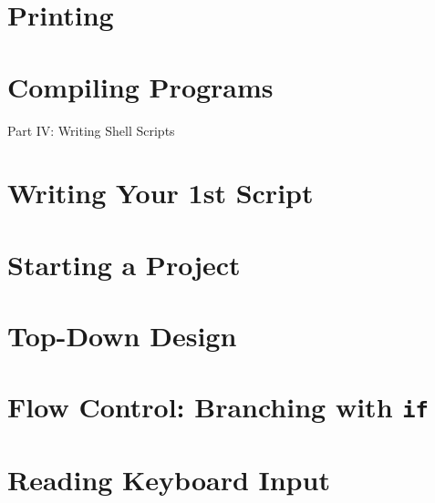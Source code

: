 \documentclass[oneside]{book}
\numberwithin{equation}{section}
\begin{document}

\section{Printing}


\section{Compiling Programs}


\begin{center}
	\huge Part IV: Writing Shell Scripts
\end{center}


\section{Writing Your 1st Script}


\section{Starting a Project}


\section{Top-Down Design}


\section{Flow Control: Branching with \texttt{if}}


\section{Reading Keyboard Input}
\end{document}
